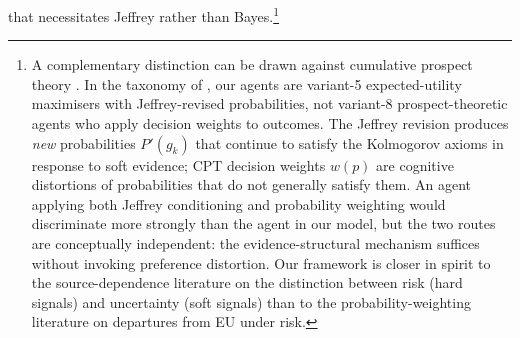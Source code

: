 \documentclass[12pt,a4paper]{article}
\theoremstyle{definition}
\numberwithin{proposition}{subsection}
\begin{document}
that necessitates Jeffrey rather than Bayes.\footnote{A complementary
distinction can be drawn against cumulative prospect theory
\citep{TverskyKahneman1992}. In the taxonomy of
\citet{Schoemaker1982}, our agents are variant-5 expected-utility
maximisers with Jeffrey-revised probabilities, not variant-8
prospect-theoretic agents who apply decision weights to outcomes. The
Jeffrey revision produces \emph{new} probabilities $P'(g_k)$ that
continue to satisfy the Kolmogorov axioms in response to soft
evidence; CPT decision weights $w(p)$ are cognitive distortions of
probabilities that do not generally satisfy them. An agent applying
both Jeffrey conditioning and probability weighting would discriminate
more strongly than the agent in our model, but the two routes are
conceptually independent: the evidence-structural mechanism suffices
without invoking preference distortion. Our framework is closer in
spirit to the source-dependence literature on the distinction between
risk (hard signals) and uncertainty (soft signals) than to the
probability-weighting literature on departures from EU under risk.}
\end{document}
